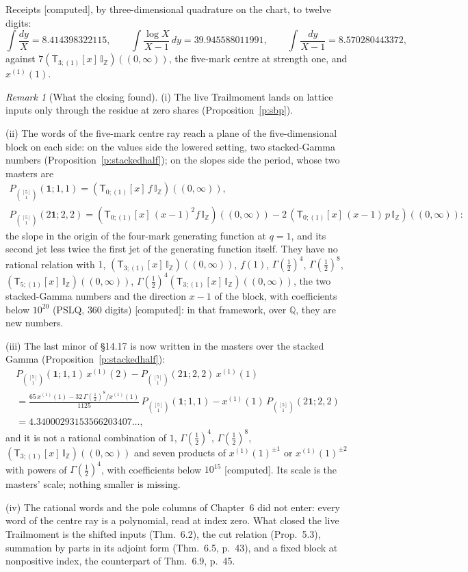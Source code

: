 \documentclass[11pt]{article}
\newcommand{\one}{\mathbf 1}
\newcommand{\sT}{\mathsf T}
\newcommand{\IZ}{\mathbb I_{\mathbb Z}}
\newcommand{\Tx}[3]{(\sT_{#1;(1)}[x]\,#2)((#3,\infty))}
\theoremstyle{plain}
\theoremstyle{definition}
\theoremstyle{remark}
\newtheorem{remark}[proposition]{Remark}
\newcommand{\computed}{\textup{[computed]}}
\begin{document}
\noindent Receipts \computed, by three-dimensional quadrature on the chart, to twelve digits:
\[
\int\frac{dy}X=8.414398322115,\qquad\int\frac{\log X}{X-1}\,dy=39.945588011991,\qquad\int\frac{dy}{X-1}=8.570280443372,
\]
against $7\Tx{3}{\IZ}{0}$, the five-mark centre at strength one, and $x^{(1)}(1)$.

\begin{remark}[What the closing found]\label{r:found}
(i) The live Trailmoment lands on lattice inputs only through the residue at zero shares (Proposition~\ref{p:sbp}).

(ii) The words of the five-mark centre ray reach a plane of the five-dimensional block on each side: on the values side the lowered setting, two stacked-Gamma numbers (Proposition~\ref{p:stackedhalf}); on the slopes side the period, whose two masters are
\begin{gather*}
P_{\binom{[5]}1}(\one;1,1)=\Tx{0}{f\,\IZ}{0},\\
P_{\binom{[5]}1}(2\one;2,2)=\Tx{0}{(x-1)^2f\,\IZ}{0}-2\,\Tx{0}{(x-1)\,p\,\IZ}{0}:
\end{gather*}
the slope in the origin of the four-mark generating function at $q=1$, and its second jet less twice the first jet of the generating function itself. They have no rational relation with $1$, $\Tx{3}{\IZ}{0}$, $f(1)$, $\Gamma(\frac12)^4$, $\Gamma(\frac12)^8$, $\Tx{5}{\IZ}{0}$, $\Gamma(\frac12)^4\Tx{3}{\IZ}{0}$, the two stacked-Gamma numbers and the direction $x-1$ of the block, with coefficients below $10^{20}$ (PSLQ, $360$ digits) \computed: in that framework, over $\mathbb Q$, they are new numbers.

(iii) The last minor of \S14.17 is now written in the masters over the stacked Gamma (Proposition~\ref{p:stackedhalf}):
\begin{multline*}
P_{\binom{[5]}1}(\one;1,1)\,x^{(1)}(2)-P_{\binom{[5]}1}(2\one;2,2)\,x^{(1)}(1)\\
=\frac{65\,x^{(1)}(1)-32\,\Gamma(\frac12)^8/x^{(1)}(1)}{1125}\,P_{\binom{[5]}1}(\one;1,1)-x^{(1)}(1)\,P_{\binom{[5]}1}(2\one;2,2)\\
=4.34000293153566203407\ldots,
\end{multline*}
and it is not a rational combination of $1$, $\Gamma(\frac12)^4$, $\Gamma(\frac12)^8$, $\Tx{3}{\IZ}{0}$ and seven products of $x^{(1)}(1)^{\pm1}$ or $x^{(1)}(1)^{\pm2}$ with powers of $\Gamma(\frac12)^4$, with coefficients below $10^{15}$ \computed. Its scale is the masters' scale; nothing smaller is missing.

(iv) The rational words and the pole columns of Chapter~6 did not enter: every word of the centre ray is a polynomial, read at index zero. What closed the live Trailmoment is the shifted inputs (Thm.~6.2), the cut relation (Prop.~5.3), summation by parts in its adjoint form (Thm.~6.5, p.~43), and a fixed block at nonpositive index, the counterpart of Thm.~6.9, p.~45.


\end{remark}
\end{document}
